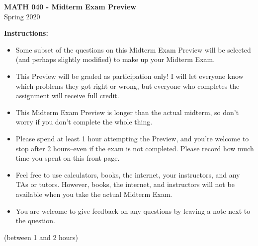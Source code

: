 \addpoints
\setlength{\parindent}{0cm}

\begin{center}

{\Large\textbf{MATH 040 - Midterm Exam Preview}}\\
\medskip
{\Large{Spring 2020}}

\vskip1cm
\vskip0.4cm
\vskip0.4cm

\vskip0.4cm

\end{center}
\bigskip
\textbf{Instructions:}
\begin{itemize}
  \item Some subset of the questions on this Midterm Exam Preview will be selected (and perhaps slightly modified) to make up your Midterm Exam.
  \item This Preview will be graded as participation only! I will let everyone
  know which problems they got right or wrong, but everyone who completes the
  assignment will receive full credit.
  \item This Midterm Exam Preview is longer than the actual midterm, so
  don't worry if you don't complete the whole thing.
  \item Please spend at least 1 hour attempting the Preview, and you're welcome to stop after 2 hours--even if the exam is not completed. Please record how much time
  you spent on this front page.
  \item Feel free to use calculators, books, the internet, your instructors, and
  any TAs or tutors. However, books, the internet, and instructors will not be
  available when you take the actual Midterm Exam.
  \item You are welcome to give feedback on any questions by leaving a note next to the question.
\end{itemize}
\vskip0.4cm
(between 1 and 2 hours)
\vskip0.4cm
\begin{center}
  \gradetable[h][questions]
\end{center}

\newpage
\vskip1cm
